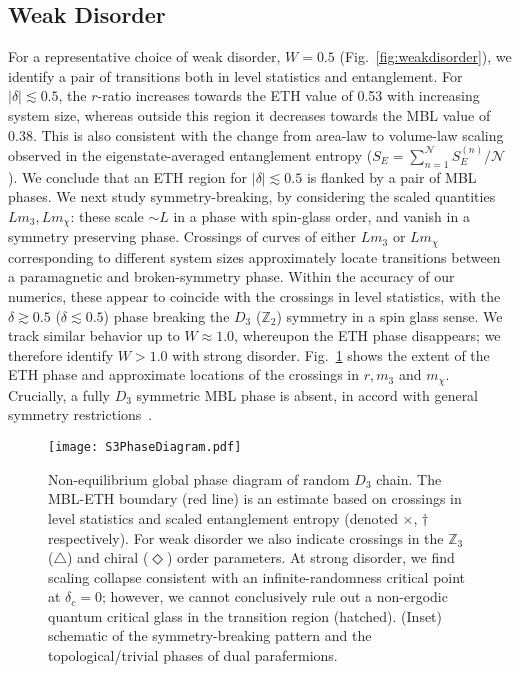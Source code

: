 \documentclass[prb,aps, twocolumn, superscriptaddress]{revtex4-1}
\begin{document}
\subsection{Weak Disorder} For a representative choice of weak disorder, $W=0.5$ (Fig.~\ref{fig:weakdisorder}), we identify a pair of transitions both in level statistics and entanglement. For $|\delta| \lesssim 0.5$, the $r$-ratio increases towards the ETH value of 0.53 with increasing system size, whereas outside this region it decreases towards the MBL value of 0.38. This is also consistent with the change from area-law to volume-law scaling observed in the eigenstate-averaged entanglement entropy ($S_E = \sum_{n=1}^{\mathcal{N}}S_E^{(n)}/\mathcal{N}$). We conclude that an ETH region for $|\delta| \lesssim 0.5$ is flanked by a pair of MBL phases. We next study symmetry-breaking, by considering the scaled quantities $L{m_3}, Lm_{\chi}$: these scale $\sim L$ in a phase with spin-glass order, and vanish in a symmetry preserving phase. Crossings of curves of either $L{m_3}$ or $Lm_{\chi}$ corresponding to different system sizes approximately locate transitions between a paramagnetic and broken-symmetry phase. Within the accuracy of our numerics, these appear to coincide with the crossings in level statistics, with the $\delta\gtrsim 0.5$ ($\delta\lesssim 0.5$) phase breaking the $D_3$ (${\mathbb{Z}_2}$) symmetry in a spin glass sense. We track similar behavior up to $W\approx1.0$, whereupon the ETH phase disappears; we therefore identify $W>1.0$ with strong disorder. Fig.~\ref{fig:phasediag} shows the extent of the ETH phase and approximate locations of the crossings in $r, {m_3}$ and $m_\chi$. Crucially, a fully $D_3$ symmetric MBL phase is absent, in accord with general symmetry restrictions~\cite{PhysRevB.94.224206}.

\begin{figure}[t]
\texttt{[image: S3PhaseDiagram.pdf]} 
\caption{\label{fig:phasediag} Non-equilibrium global phase diagram of random $D_3$ chain. The MBL-ETH boundary (red line) is an estimate based on crossings in level statistics and scaled entanglement entropy (denoted $\times$, $\dagger$ respectively). For weak disorder we also indicate crossings in the ${\mathbb{Z}_3}$ ($\triangle$) and chiral ($\Diamond$) order parameters. At strong disorder, we find scaling collapse consistent with an infinite-randomness critical point at $\delta_c=0$; however, we cannot conclusively rule out a non-ergodic quantum critical glass in the transition region (hatched). 
{(Inset) schematic of the symmetry-breaking pattern and the topological/trivial phases of dual parafermions.}
}
\end{figure}
\end{document}
